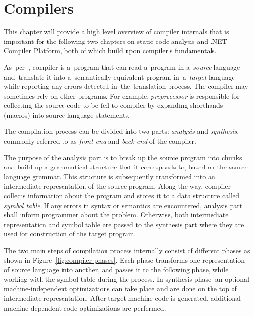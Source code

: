 \documentclass[
  digital, %
  table,   %
  lof,     %
  lot,     %
  oneside,
]{fithesis3}
\begin{document}
\chapter{Compilers}
\label{chap:compilers}
This chapter will provide a high level overview of compiler internals that is important for the following two chapters on static code analysis and .NET Compiler Platform, both of which build upon compiler's fundamentals.

As~per~\cite{dragon-book}, compiler is a~program that can read a~program in a~\textit{source} language and~translate it into a~semantically equivalent program in~a~\textit{target} language while reporting any errors detected in~the~translation process. The compiler may sometimes rely on other programs. For example, \textit{preprocessor} is responsible for collecting the source code to be fed to compiler by expanding shorthands (macros) into source language statements. 

The compilation process can be divided into two parts: \textit{analysis} and \textit{synthesis}, commonly referred to as \textit{front end} and \textit{back end} of the compiler.

The purpose of the analysis part is to break up the source program into chunks and build up a grammatical structure that it corresponds to, based on the source language grammar. This structure is subsequently transformed into an intermediate representation of the source program. Along the way, compiler collects information about the program and stores it to a data structure called \textit{symbol table}. If any errors in syntax or semantics are encountered, analysis part shall inform programmer about the problem. Otherwise, both intermediate representation and symbol table are passed to the synthesis part where they are used for construction of the target program.

The two main steps of compilation process internally consist of different phases as shown in Figure~\ref{fig:compiler-phases}. Each phase transforms one representation of source language into another, and passes it to the following phase, while working with the symbol table during the process. In synthesis phase, an optional machine-independent optimizations can take place and are done on the top of intermediate representation. After target-machine code is generated, additional machine-dependent code optimizations are performed.
\end{document}
